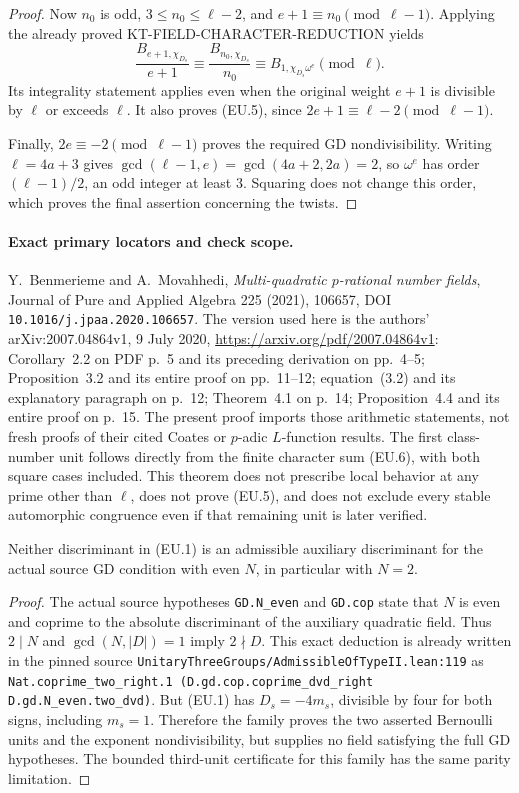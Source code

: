 \begin{proof}
Now $n_0$ is odd, $3\leq n_0\leq\ell-2$, and
$e+1\equiv n_0\pmod{\ell-1}$.  Applying the already proved
KT-FIELD-CHARACTER-REDUCTION yields
\[
 \frac{B_{e+1,\chi_{D_s}}}{e+1}
 \equiv\frac{B_{n_0,\chi_{D_s}}}{n_0}
 \equiv B_{1,\chi_{D_s}\omega^e}\pmod\ell.                 \tag{EU.9}
\]
Its integrality statement applies even when the original weight
$e+1$ is divisible by $\ell$ or exceeds $\ell$.  It also proves
(EU.5), since $2e+1\equiv\ell-2\pmod{\ell-1}$.

Finally, $2e\equiv-2\pmod{\ell-1}$ proves the required GD
nondivisibility.  Writing $\ell=4a+3$ gives
$\gcd(\ell-1,e)=\gcd(4a+2,2a)=2$, so $\omega^e$ has order
$(\ell-1)/2$, an odd integer at least $3$.  Squaring does not change
this order, which proves the final assertion concerning the twists.
\end{proof}

\paragraph{Exact primary locators and check scope.}
Y.~Benmerieme and A.~Movahhedi, \emph{Multi-quadratic $p$-rational
number fields}, Journal of Pure and Applied Algebra 225 (2021),
106657, DOI \texttt{10.1016/j.jpaa.2020.106657}.
The version used here is the authors' arXiv:2007.04864v1,
9 July 2020, \url{https://arxiv.org/pdf/2007.04864v1}:
Corollary~2.2 on PDF p.~5 and its preceding derivation on pp.~4--5;
Proposition~3.2 and its entire proof on pp.~11--12;
equation~(3.2) and its explanatory paragraph on p.~12;
Theorem~4.1 on p.~14; Proposition~4.4 and its entire proof on p.~15.
The present proof imports those arithmetic statements, not fresh
proofs of their cited Coates or $p$-adic $L$-function results.
The first class-number unit follows directly from the finite character
sum (EU.6), with both square cases included.
This theorem does not prescribe local behavior at any prime other than
$\ell$, does not prove (EU.5), and does not exclude every stable
automorphic congruence even if that remaining unit is later verified.

\begin{proposition}
Neither discriminant in (EU.1) is an admissible auxiliary discriminant
for the actual source GD condition with even $N$, in particular with
$N=2$.
\end{proposition}
\begin{proof}
The actual source hypotheses \texttt{GD.N\_even} and
\texttt{GD.cop} state that $N$ is even and coprime to the absolute
discriminant of the auxiliary quadratic field.  Thus $2\mid N$
and $\gcd(N,|D|)=1$ imply $2\nmid D$.  This exact deduction is
already written in the pinned source
\texttt{UnitaryThreeGroups/AdmissibleOfTypeII.lean:119} as
\texttt{Nat.coprime\_two\_right.1
(D.gd.cop.coprime\_dvd\_right D.gd.N\_even.two\_dvd)}.
But (EU.1) has $D_s=-4m_s$, divisible by four for both signs,
including $m_s=1$.  Therefore the family proves the two asserted
Bernoulli units and the exponent nondivisibility, but supplies no
field satisfying the full GD hypotheses.  The bounded third-unit
certificate for this family has the same parity limitation.
\end{proof}
